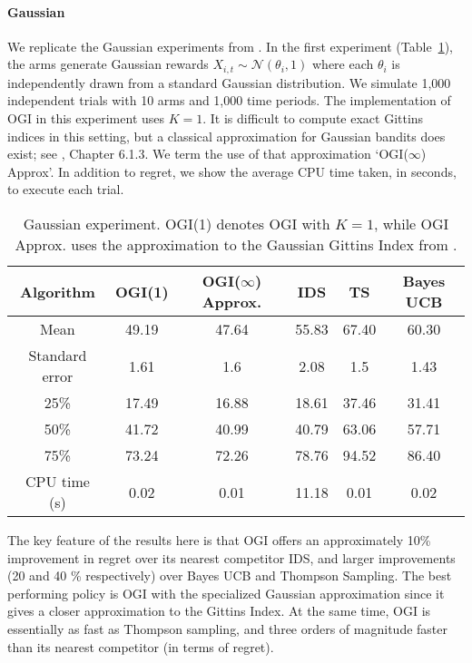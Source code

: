 \paragraph{Gaussian}We replicate the Gaussian experiments from \cite{russo2014learning}. In the first experiment (Table~\ref{table:gaussian_experiment1}), the arms generate Gaussian rewards  $X_{i,t} \sim \mathcal{N}(\theta_i, 1)$ where each $\theta_i$ is independently drawn from a standard Gaussian distribution. We simulate 1,000 independent trials with 10 arms and 1,000 time periods. The implementation of OGI in this experiment uses $K = 1$. It is difficult to compute exact Gittins indices in this setting, but a classical approximation for Gaussian bandits does exist; see \cite{powell2012optimal}, Chapter 6.1.3. We term the use of that approximation `OGI($\infty$) Approx'.  In addition to regret, we  show the average CPU time taken, in seconds, to execute each trial.

\begin{table}[h!]
	\centering
	\begin{tabular}{cccccc} \toprule
		\textbf{Algorithm}  & \textbf{OGI(1)} & \textbf{OGI($\infty$) Approx.} & \textbf{IDS} & \textbf{TS} & \textbf{Bayes UCB}\\ \midrule
		Mean   & 49.19 & 47.64  &  55.83 & 67.40 & 60.30  \\ 
		Standard error  & 1.61 & 1.6 & 2.08 & 1.5 & 1.43 \\ 
		25\%  & 17.49 & 16.88  & 18.61 & 37.46 & 31.41 \\
		50\%   & 41.72 & 40.99 & 40.79 & 63.06 & 57.71 \\ 
		75\%  & 73.24 & 72.26 & 78.76 & 94.52 & 86.40 \\ 
		CPU time (s) & 0.02 & 0.01 & 11.18 & 0.01 & 0.02 \\
		\bottomrule
	\end{tabular}
	\caption[Table caption text]{Gaussian experiment. OGI(1) denotes OGI with $K =1$, while OGI Approx. uses the approximation to the Gaussian Gittins Index from \cite{powell2012optimal}.}
	\label{table:gaussian_experiment1}
\end{table}

The key feature of the results here is that OGI offers an approximately 10\% improvement in regret over its nearest competitor IDS, and larger improvements (20 and 40 \% respectively) over Bayes UCB and Thompson Sampling. The best performing policy is OGI with the specialized Gaussian approximation since it gives a closer approximation to the Gittins Index. At the same time, OGI is essentially as fast as Thompson sampling, and three orders of magnitude faster than its nearest competitor (in terms of regret). 


